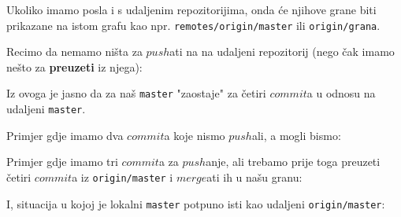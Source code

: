 

Ukoliko imamo posla i s udaljenim repozitorijima, onda će njihove grane biti prikazane na istom grafu kao npr. \verb+remotes/origin/master+ ili \verb+origin/grana+.

Recimo da nemamo ništa za $push$ati na na udaljeni repozitorij (nego čak imamo nešto za \textbf{preuzeti} iz njega):


Iz ovoga je jasno da za naš \verb+master+ "zaostaje" za četiri $commit$a u odnosu na udaljeni \verb+master+.

Primjer gdje imamo dva $commit$a koje nismo $push$ali, a mogli bismo:


Primjer gdje imamo tri $commit$a za $push$anje, ali trebamo prije toga preuzeti četiri $commit$a iz \verb+origin/master+ i $merge$ati ih u našu granu:


I, situacija u kojoj je lokalni \verb+master+ potpuno isti kao udaljeni \verb+origin/master+:


